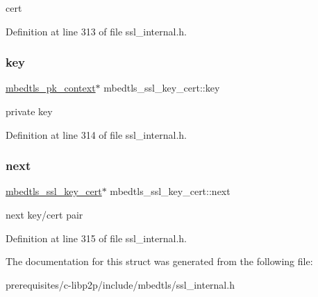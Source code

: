 cert 

Definition at line 313 of file ssl\+\_\+internal.\+h.

\mbox{\label{structmbedtls__ssl__key__cert_a36357248c58a208bf8e820b75f2f118f}} 
\subsubsection{\texorpdfstring{key}{key}}
{\footnotesize\ttfamily \mbox{\hyperlink{structmbedtls__pk__context}{mbedtls\+\_\+pk\+\_\+context}}$\ast$ mbedtls\+\_\+ssl\+\_\+key\+\_\+cert\+::key}

private key 

Definition at line 314 of file ssl\+\_\+internal.\+h.

\mbox{\label{structmbedtls__ssl__key__cert_ac8969b0a63df001f997cab96154db160}} 
\subsubsection{\texorpdfstring{next}{next}}
{\footnotesize\ttfamily \mbox{\hyperlink{structmbedtls__ssl__key__cert}{mbedtls\+\_\+ssl\+\_\+key\+\_\+cert}}$\ast$ mbedtls\+\_\+ssl\+\_\+key\+\_\+cert\+::next}

next key/cert pair 

Definition at line 315 of file ssl\+\_\+internal.\+h.



The documentation for this struct was generated from the following file\+:\begin{DoxyCompactItemize}
\item 
prerequisites/c-\/libp2p/include/mbedtls/ssl\+\_\+internal.\+h\end{DoxyCompactItemize}
